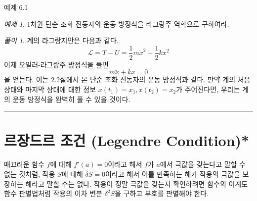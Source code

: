 \documentclass[chapter, oneside, b5paper]{oblivoir}
\theoremstyle{plain}
\theoremstyle{definition}
\theoremstyle{remark}
\newtheorem{example}{예제}[chapter]    %
\newtheorem*{solution}{풀이}
\begin{document}
\begin{examplebox}{예제 6.1}
\begin{example}
1차원 단순 조화 진동자의 운동 방정식을 라그랑주 역학으로 구하여라.
\end{example}
\end{examplebox}

\begin{solution}
    계의 라그랑지안은 다음과 같다.
    \begin{equation}
        \mathcal{L} = T - U = \frac{1}{2}m\dot{x}^2 - \frac{1}{2}kx^2
    \end{equation}
    이제 오일러-라그랑주 방정식을 풀면
    \begin{equation}
        m\ddot{x}+kx = 0
    \end{equation}
    을 얻는다. 이는 2.2절에서 본 단순 조화 진동자의 운동 방정식과 같다. 만약 계의 처음 상태와 마지막 상태에 대한 정보 $x(t_1) = x_1, x(t_2) = x_2$가 주어진다면, 우리는 계의 운동 방정식을 완벽히 풀 수 있을 것이다.
\end{solution}

\noindent\rule{\textwidth}{0.8pt} %
\vspace{1em} %

\section{르장드르 조건 (Legendre Condition)*}
매끄러운 함수 $f$에 대해 $f'(a) = 0$이라고 해서 $f$가 $a$에서 극값을 갖는다고 말할 수 없는 것처럼, 작용 $S$에 대해 $\delta S = 0$이라고 해서 이를 만족하는 해가 작용의 극값을 보장하는 해라고 말할 수는 없다. 작용이 정말 극값을 갖는지 확인하려면 함수의 이계도함수 판별법처럼 작용의 이차 변분 $\delta^2 S$을 구하고 부호를 판별해야 한다.
\end{document}
